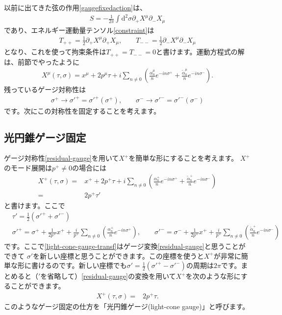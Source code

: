 \documentclass[report,paper=a4, fontsize=12pt, line_length=16cm, number_of_lines=33,dvipdfmx]{jlreq}
\numberwithin{equation}{chapter}
\numberwithin{equation}{section}
\newcommand{\del}{\partial}
\newcommand{\alphat}{\tilde{\alpha}}
\newcommand{\di}{\mathrm{d}}
\begin{document}
以前に出てきた弦の作用\eqref{gaugefixedaction}は、
\begin{align}
S=-\frac{1}{2\pi}\int \di^2\sigma \del_{+}X^{\mu}\del_{-}X_{\mu}
\end{align}
であり、エネルギー運動量テンソル\eqref{constraint}は
\begin{align}
T_{++}=\frac12 \del_{+}X^{\mu}\del_{+}X_{\mu},\qquad
T_{--}=\frac12 \del_{-}X^{\mu}\del_{-}X_{\mu}
\label{EMtensor}
\end{align}
となり、これを使って拘束条件は$T_{++}=T_{--}=0$と書けます。運動方程式の解は、前節でやったように
\begin{align}
X^{\mu}(\tau,\sigma)=x^{\mu}+2p^{\mu}\tau+i\sum_{n\ne 0} \left(
\frac{\alpha^{\mu}_{n}}{n}e^{-in\sigma^{+}}
+\frac{\alphat^{\mu}_{n}}{n}e^{-in\sigma^{-}}
\right).
\end{align}
残っているゲージ対称性は
\begin{align}
\sigma^{+}\to \sigma'^{+}=\sigma'^{+}(\sigma^{+})
,\qquad \sigma^{-}\to \sigma'^{-}=\sigma'^{-}(\sigma^{-})
\label{residual-gauge}
\end{align}
です。次にこの対称性を固定することを考えます。
\subsection{光円錐ゲージ固定}
ゲージ対称性\eqref{residual-gauge}を用いて$X^{+}$を簡単な形にすることを考えます。
$X^{+}$のモード展開は$p^{+}\ne 0$の場合には
\begin{align}
X^{+}(\tau,\sigma)=&x^{+}+2p^{+}\tau+i\sum_{n\ne 0} \left(
\frac{\alpha^{+}_{n}}{n}e^{-in\sigma^{+}}
+\frac{\alphat^{+}_{n}}{n}e^{-in\sigma^{-}}
\right)\\
=&2p^{+}\tau'
\end{align}
と書けます。ここで
\begin{align}
&\tau'=\frac12(\sigma'^{+}+\sigma'^{-})\\
&
\sigma'^{+}=\sigma^{+}+\frac{1}{2p^{+}}x^{+}+\frac{i}{p^{+}}\sum_{n\ne 0} \left(
\frac{\alpha^{+}_{n}}{n}e^{-in\sigma^{+}}
\right),\qquad
\sigma'^{-}=\sigma^{-}+\frac{1}{2p^{+}}x^{+}+\frac{i}{p^{+}}\sum_{n\ne 0} \left(
\frac{\alphat^{+}_{n}}{n}e^{-in\sigma^{-}}
\right)\label{light-cone-gauge-transf}
\end{align}
です。ここで\eqref{light-cone-gauge-transf}はゲージ変換\eqref{residual-gauge}と思うことができて
$\sigma'$を新しい座標と思うことができます。この座標を使うと$X^{+}$が非常に簡単な形に書けるのです。新しい座標でも$\sigma'=\frac12(\sigma'^{+}-\sigma'^{-})$の周期は$2\pi$です。まとめると（${}'$を省略して）\eqref{residual-gauge}の変換を用いて$X^{+}$を次のような形にすることができます。
\begin{align}
X^{+}(\tau,\sigma)=&2p^{+}\tau.
\label{light-cone-gauge-fixing}
\end{align}
このようなゲージ固定の仕方を「光円錐ゲージ(light-cone gauge)」と呼びます。
\end{document}
